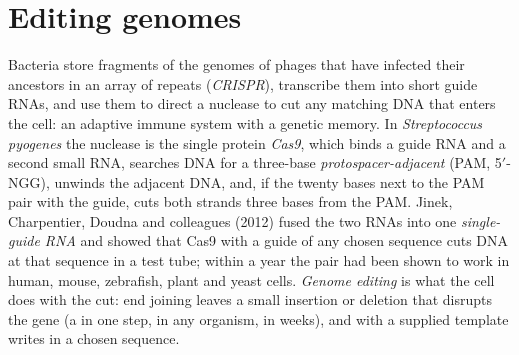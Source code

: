 \section{Editing genomes}

\begin{definition}\label{def:b3:genetic-engineering:crispr}
Bacteria store fragments of the genomes of phages that have infected
their ancestors in an array of repeats (\emph{CRISPR}), transcribe them
into short guide RNAs, and use them to direct a nuclease to cut any
matching DNA that enters the cell: an adaptive immune system with a
genetic memory. In \emph{Streptococcus pyogenes} the nuclease is the
single protein \emph{Cas9}, which binds a guide RNA and a second small
RNA, searches DNA for a three-base \emph{protospacer-adjacent }
(PAM, 5$'$-NGG), unwinds the adjacent DNA, and, if the twenty bases
next to the PAM pair with the guide, cuts both strands three bases from
the PAM. Jinek, Charpentier, Doudna and colleagues (2012) fused the two
RNAs into one \emph{single-guide RNA} and showed that Cas9 with a guide
of any chosen sequence cuts DNA at that sequence in a test tube; within
a year the pair had been shown to work in human, mouse, zebrafish,
plant and yeast cells. \emph{Genome editing} is what the cell does
with the cut: end joining leaves a small insertion or deletion that
disrupts the gene (a  in one step, in any organism, in weeks),
and  with a supplied template writes in a
chosen sequence.
\end{definition}

